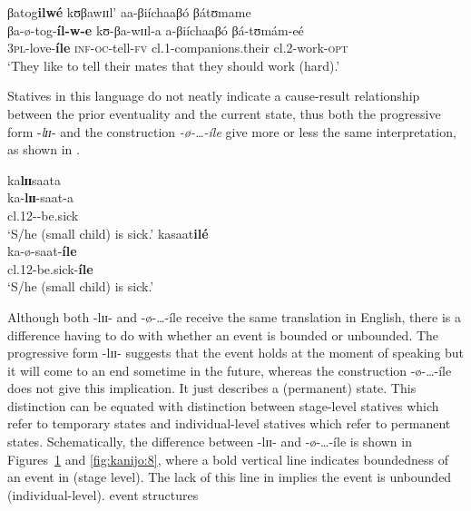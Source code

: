 \documentclass[output=paper,newtxmath,modfonts,nonflat,draftmode]{langsci/langscibook}
\begin{document}
\ex 
    \glll   βatog\textbf{ilwé}          kʊβawɪɪl’       aa-βiíchaaβó    βátʊmame\\       
            βa-ø-tog-\textbf{íl-w-e}    kʊ-βa-wɪɪl-a    a-βiíchaaβó     βá-tʊmám-eé\\          
    3\textsc{pl}-love-\textbf{íle}       \textsc{inf}-\textsc{oc}-tell-\textsc{fv} cl.1-companions.their    cl.2-work-\textsc{opt}\\
  \glt ‘They like to tell their mates that they should work (hard).’
\z
\z

Statives in this language do not neatly indicate a cause-result relationship between the prior eventuality and the current state, thus both the progressive form -\textit{lɪɪ}- and the construction \textit{-ø}\textit{-…-íle} give more or less the same interpretation, as shown in . 

\ea \label{ex:kanijo:19}
\ea 
    \glll ka\textbf{l}\textbf{ɪɪ}saata\\   
    ka-\textbf{lɪɪ}-saat-a\\                              
     cl.12-\textbf{}-be.sick\\            
    \glt `S/he (small child) is sick.’         
\ex 
\glll kasaat\textbf{ilé}\\
ka-ø-saat-\textbf{íle}\\
cl.12-be.sick-\textbf{íle}\\
\glt `S/he (small child) is sick.’ 
\z
\z

Although both -lɪɪ- and -ø-\ldots-íle receive the same translation in English, there is a difference having to do with whether an event is bounded or unbounded. The progressive form -lɪɪ- suggests that the event holds at the moment of speaking but it will come to an end sometime in the future, whereas the construction -ø-\ldots-íle does not give this implication. It just describes a (permanent) state. This distinction can be equated with  distinction between stage-level statives which refer to temporary states and individual-level statives which refer to permanent states. Schematically, the difference between -lɪɪ- and -ø-\ldots-íle is shown in Figures~\ref{fig:kanijo:7} and \ref{fig:kanijo:8}, where a bold vertical line indicates boundedness of an event in  (stage level). The lack of this line in \textup{} implies the event is unbounded (individual-level). event structures 


\begin{figure}
\caption{\label{fig:kanijo:7}}
\end{figure}
\end{document}
